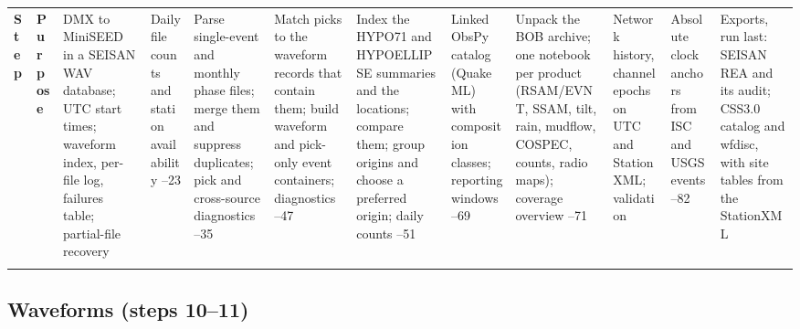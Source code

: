 \documentclass[linenum]{SSA-SRL}
\begin{document}
\begin{table}
{\begin{tabular*}{\textwidth}{@{\extracolsep{\fill}}lp{}@{}}
\toprule
\textbf{Step} & \textbf{Purpose}  & DMX to MiniSEED in a SEISAN WAV database; UTC start times; waveform index, per-file log, failures table; partial-file recovery  & Daily file counts and station availability --23 & Parse single-event and monthly phase files; merge them and suppress duplicates; pick and cross-source diagnostics --35 & Match picks to the waveform records that contain them; build waveform and pick-only event containers; diagnostics --47 & Index the HYPO71 and HYPOELLIPSE summaries and the \citet{Jones_2001} locations; compare them; group origins and choose a preferred origin; daily counts --51 & Linked ObsPy catalog (QuakeML) with composition classes; reporting windows --69 & Unpack the BOB archive; one notebook per product (RSAM/EVNT, SSAM, tilt, rain, mudflow, COSPEC, counts, radio maps); coverage overview --71 & Network history, channel epochs on UTC and StationXML; validation  & Absolute clock anchors from ISC and USGS events --82 & Exports, run last: SEISAN REA and its audit; CSS3.0 catalog and wfdisc, with site tables from the StationXML \\
\botrule
\end{tabular*}}
{}
\end{table}

\subsection{Waveforms (steps 10--11)}
\end{document}
